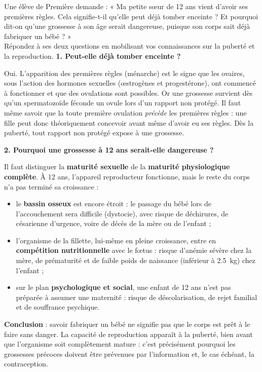 \documentclass[11pt]{article}
\begin{document}
\begin{exoresolu}
Une élève de Première demande : « Ma petite sœur de 12 ans vient d'avoir ses premières règles. Cela signifie-t-il qu'elle peut déjà tomber enceinte ? Et pourquoi dit-on qu'une grossesse à son âge serait dangereuse, puisque son corps sait déjà fabriquer un bébé ? »\\
Répondez à ses deux questions en mobilisant vos connaissances sur la puberté et la reproduction.
\tcblower
\textbf{1. Peut-elle déjà tomber enceinte ?}

Oui. L'apparition des premières règles (ménarche) est le signe que les ovaires, sous l'action des hormones sexuelles (œstrogènes et progestérone), ont commencé à fonctionner et que des ovulations sont possibles. Or une grossesse survient dès qu'un spermatozoïde féconde un ovule lors d'un rapport non protégé. Il faut même savoir que la toute première ovulation \emph{précède} les premières règles : une fille peut donc théoriquement concevoir avant même d'avoir eu ses règles. Dès la puberté, tout rapport non protégé expose à une grossesse.

\textbf{2. Pourquoi une grossesse à 12 ans serait-elle dangereuse ?}

Il faut distinguer la \textbf{maturité sexuelle} de la \textbf{maturité physiologique complète}. À 12 ans, l'appareil reproducteur fonctionne, mais le reste du corps n'a pas terminé sa croissance :
\begin{itemize}
\item le \textbf{bassin osseux} est encore étroit : le passage du bébé lors de l'accouchement sera difficile (dystocie), avec risque de déchirures, de césarienne d'urgence, voire de décès de la mère ou de l'enfant ;
\item l'organisme de la fillette, lui-même en pleine croissance, entre en \textbf{compétition nutritionnelle} avec le fœtus : risque d'anémie sévère chez la mère, de prématurité et de faible poids de naissance (inférieur à \SI{2,5}{kg}) chez l'enfant ;
\item sur le plan \textbf{psychologique et social}, une enfant de 12 ans n'est pas préparée à assumer une maternité : risque de déscolarisation, de rejet familial et de souffrance psychique.
\end{itemize}

\textbf{Conclusion} : savoir fabriquer un bébé ne signifie pas que le corps est prêt à le faire sans danger. La capacité de reproduction apparaît à la puberté, bien avant que l'organisme soit complètement mature : c'est précisément pourquoi les grossesses précoces doivent être prévenues par l'information et, le cas échéant, la contraception.
\end{exoresolu}
\end{document}
